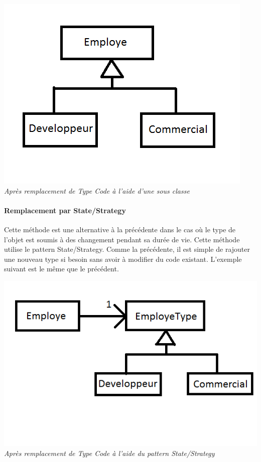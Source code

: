 \documentclass[a4paper,twoside,12pt,openright]{report}
\begin{document}
\begin{center}
\includegraphics[scale=1]{Image/TypeCode_SousClasse2.png}\\
\itshape{Après remplacement de Type Code à l'aide d'une sous classe}
\end{center}

\paragraph{Remplacement par State/Strategy}
Cette méthode est une alternative à la précédente dans le cas où le type de l'objet est soumis à des changement pendant sa durée de vie. Cette méthode utilise le pattern State/Strategy. Comme la précédente, il est simple de rajouter une nouveau type si besoin sans avoir à modifier du code existant. L'exemple suivant est le même que le précédent.

\begin{center}
\includegraphics[scale=1]{Image/TypeCode_State.png}\\
\itshape{Après remplacement de Type Code à l'aide du pattern State/Strategy}
\end{center}
\end{document}

